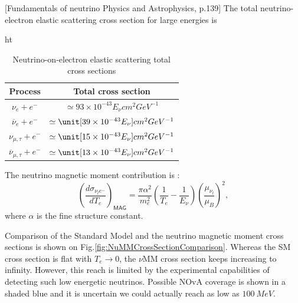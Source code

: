 [Fundamentals of neutrino Physics and Astrophysics, p.139]
The total neutrino-electron elastic scattering cross section for large energies is
\begin{table}{ht}
\centering
\caption{Neutrino-on-electron elastic scattering total cross sections}
\begin{tabular}{cc}
\hline
Process & Total cross section\\\hline
$\nu_e+e^-$ & $\simeq 93\times 10^{-43} E_\nu\unit{cm^2 GeV^{-1}}$\\
$\overline{\nu}_e+e^-$ & $\simeq \unit[39\times 10^{-43} E_\nu]{cm^2 GeV^{-1}}$\\
$\nu_{\mu,\tau}+e^-$ & $\simeq \unit[15\times 10^{-43} E_\nu]{cm^2 GeV^{-1}}$\\
$\overline{\nu}_{\mu,\tau}+e^-$ & $\simeq \unit[13\times 10^{-43} E_\nu]{cm^2 GeV^{-1}}$\\\hline
\end{tabular}
\end{table}

The neutrino magnetic moment contribution is  \cite{nuElmagInt2015.pdf}:
\begin{equation}
\left(\frac{d\sigma_{\nu_le^-}}{dT_e}\right)_{\textsf{MAG}}=\frac{\pi\alpha^2}{m_e^2}\left(\frac{1}{T_e}-\frac{1}{E_{\nu}}\right)\left(\frac{\mu_{\nu_l}}{\mu_B}\right)^2,
\end{equation}
where $\alpha$ is the fine structure constant.

Comparison of the Standard Model and the neutrino magnetic moment cross sections is shown on Fig.\ref{fig:NuMMCrossSectionComparison}. Whereas the SM cross section is flat with $T_e\rightarrow 0$, the $\nu$MM cross section keeps increasing to infinity. However, this reach is limited by the experimental capabilities of detecting such low energetic neutrinos. Possible NOvA coverage is shown in a shaded blue and it is uncertain we could actually reach as low as $100\ \unit{MeV}$.


